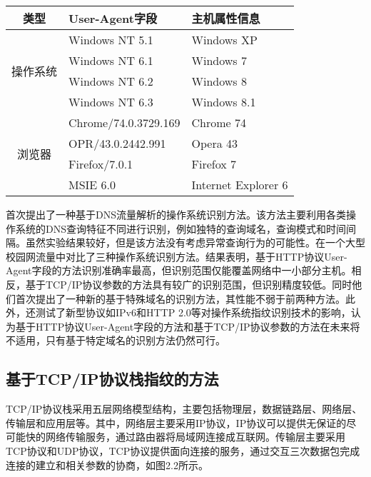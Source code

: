 \begin{table}[!htbp] 
    \centering
    \footnotesize
    \setlength{\tabcolsep}{15pt}
    \renewcommand{\arraystretch}{1.2}
\begin{tabular}{cll}
\toprule
类型 & User-Agent字段 & 主机属性信息\\ \hline
\multirow{4}{*}{操作系统} & Windows NT 5.1 &Windows XP\\ 
& Windows NT 6.1 & Windows 7\\ 
& Windows NT 6.2 &Windows 8\\ 
& Windows NT 6.3 &Windows 8.1\\ \cline{2-3}
\multirow{4}{*}{浏览器} & Chrome/74.0.3729.169 & Chrome 74 \\
& OPR/43.0.2442.991 & Opera 43 \\
& Firefox/7.0.1 & Firefox 7 \\
& MSIE 6.0 & Internet Explorer 6 \\
\bottomrule
\end{tabular}
\end{table}

\citet{matsunaka2013passive}首次提出了一种基于DNS流量解析的操作系统识别方法。该方法主要利用各类操作系统的DNS查询特征不同进行识别，例如独特的查询域名，查询模式和时间间隔。虽然实验结果较好，但是该方法没有考虑异常查询行为的可能性。\citet{lastovicka2018passive}在一个大型校园网流量中对比了三种操作系统识别方法。结果表明，基于HTTP协议User-Agent字段的方法识别准确率最高，但识别范围仅能覆盖网络中一小部分主机。相反，基于TCP/IP协议参数的方法具有较广的识别范围，但识别精度较低。同时他们首次提出了一种新的基于特殊域名的识别方法，其性能不弱于前两种方法。此外，\citet{lastovicka2018passive}还测试了新型协议如IPv6和HTTP 2.0等对操作系统指纹识别技术的影响，认为基于HTTP协议User-Agent字段的方法和基于TCP/IP协议参数的方法在未来将不适用，只有基于特定域名的识别方法仍然可行。

\subsection{基于TCP/IP协议栈指纹的方法}

TCP/IP协议栈采用五层网络模型结构，主要包括物理层，数据链路层、网络层、传输层和应用层等。其中，网络层主要采用IP协议，IP协议可以提供无保证的尽可能快的网络传输服务，通过路由器将局域网连接成互联网。传输层主要采用TCP协议和UDP协议，TCP协议提供面向连接的服务，通过交互三次数据包完成连接的建立和相关参数的协商，如图2.2所示。

